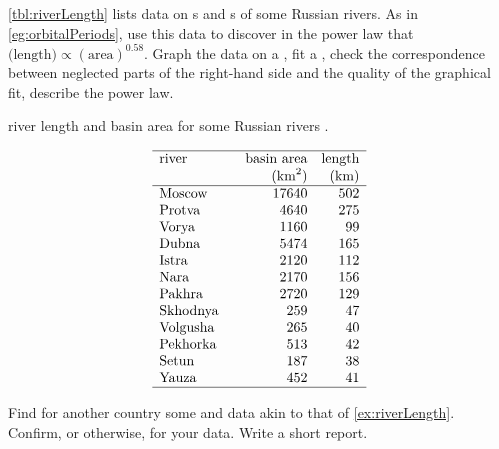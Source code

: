 \begin{exercise} \label{ex:riverLength} 
\cref{tbl:riverLength} lists data on s and s of some Russian rivers. 
As in \cref{eg:orbitalPeriods}, use this data to discover  in the power law that \(\text{(length)}\propto(\text{area})^{0.58}\).  
Graph the data on a , fit a , check the correspondence between neglected parts of the right-hand side and the quality of the graphical fit, describe the power law.
\setbox\ajrqrbox\hbox{}%
\marginajrbox%
\begin{table}
\caption{river length and basin area for some Russian rivers \cite[p.154]{Arnold2014}.}
\label{tbl:riverLength}
\begin{equation*}
\begin{array}{p{12ex}rr} \hline
river&\text{basin area}&\text{length}\\
&(\text{km}^2)&\text{(km)}\\\hline
Moscow& 17640 & 502 \\
Protva& 4640 & 275 \\
Vorya& 1160 & 99 \\
Dubna& 5474 & 165 \\
Istra& 2120 & 112 \\
Nara& 2170 & 156 \\
Pakhra& 2720 & 129 \\
Skhodnya& 259 & 47 \\
Volgusha& 265 & 40 \\
Pekhorka& 513 & 42 \\
Setun& 187 & 38 \\
Yauza& 452 & 41 \\
\hline
\end{array}
\end{equation*}
\end{table}%
\end{exercise}

\begin{exercise} \label{ex:riverLength2} 
Find for another country some  and  data akin to that of \cref{ex:riverLength}.
Confirm, or otherwise,  for your data.  
Write a short report.
\end{exercise}


